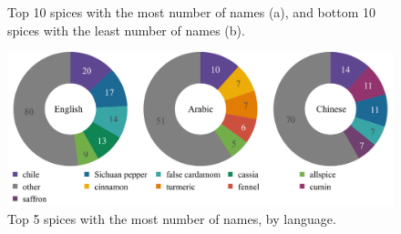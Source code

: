 \begin{figure}[!ht]
	\centering
	\hfill
	\caption[Top and bottom spices by number of names.]{Top 10 spices with the most number of names (a), and bottom 10 spices with the least number of names (b).}
	\label{fig:ids_top_and_bottom_ann}
\end{figure}

\begin{figure}[!ht]
	\centering
	\includegraphics[width=\linewidth]{imgs/plots/ids_tripie.pdf}
	\caption[Top spices by number of names, broken down by language.]{Top 5 spices with the most number of names, by language.}
	\label{fig:ids_tripie}
\end{figure}

